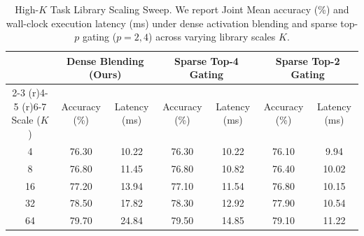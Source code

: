 \documentclass{article}
\theoremstyle{plain}
\theoremstyle{definition}
\theoremstyle{remark}
\begin{document}
\begin{table}[H]
  \caption{High-$K$ Task Library Scaling Sweep. We report Joint Mean accuracy (\%) and wall-clock execution latency (ms) under dense activation blending and sparse top-$p$ gating ($p=2, 4$) across varying library scales $K$.}
  \label{tab:high_k_sweep}
  \vskip 0.1in
  \begin{center}
  \begin{small}
  \begin{sc}
  \begin{tabular}{ccccccc}
    \toprule
    & \multicolumn{2}{c}{Dense Blending (Ours)} & \multicolumn{2}{c}{Sparse Top-4 Gating} & \multicolumn{2}{c}{Sparse Top-2 Gating} \\
    \cmidrule(r){2-3} \cmidrule(r){4-5} \cmidrule(r){6-7}
    Scale ($K$) & Accuracy (\%) & Latency (ms) & Accuracy (\%) & Latency (ms) & Accuracy (\%) & Latency (ms) \\
    \midrule
    4 & 76.30 & 10.22 & 76.30 & 10.22 & 76.10 & 9.94 \\
    8 & 76.80 & 11.45 & 76.80 & 10.82 & 76.40 & 10.02 \\
    16 & 77.20 & 13.94 & 77.10 & 11.54 & 76.80 & 10.15 \\
    32 & 78.50 & 17.82 & 78.30 & 12.92 & 77.90 & 10.54 \\
    64 & 79.70 & 24.84 & 79.50 & 14.85 & 79.10 & 11.22 \\
    \bottomrule
  \end{tabular}
  \end{sc}
  \end{small}
  \end{center}
\end{table}
\end{document}
